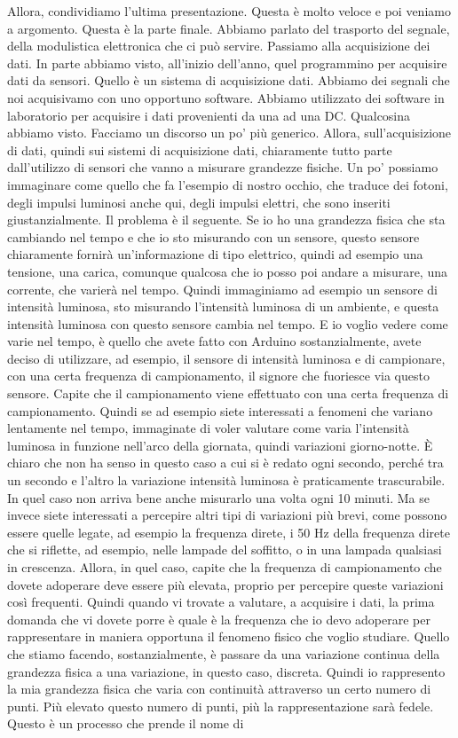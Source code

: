 Allora, condividiamo l'ultima presentazione. Questa è molto veloce e poi veniamo a argomento. Questa è la parte finale. Abbiamo parlato del trasporto del segnale, della modulistica elettronica che ci può servire. Passiamo alla acquisizione dei dati. In parte abbiamo visto, all'inizio dell'anno, quel programmino per acquisire dati da sensori. Quello è un sistema di acquisizione dati. Abbiamo dei segnali che noi acquisivamo con uno opportuno software. Abbiamo utilizzato dei software in laboratorio per acquisire i dati provenienti da una ad una DC. Qualcosina abbiamo visto. Facciamo un discorso un po' più generico. Allora, sull'acquisizione di dati, quindi sui sistemi di acquisizione dati, chiaramente tutto parte dall'utilizzo di sensori che vanno a misurare grandezze fisiche. Un po' possiamo immaginare come quello che fa l'esempio di nostro occhio, che traduce dei fotoni, degli impulsi luminosi anche qui, degli impulsi elettri, che sono inseriti giustanzialmente. Il problema è il seguente. Se io ho una grandezza fisica che sta cambiando nel tempo e che io sto misurando con un sensore, questo sensore chiaramente fornirà un'informazione di tipo elettrico, quindi ad esempio una tensione, una carica, comunque qualcosa che io posso poi andare a misurare, una corrente, che varierà nel tempo. Quindi immaginiamo ad esempio un sensore di intensità luminosa, sto misurando l'intensità luminosa di un ambiente, e questa intensità luminosa con questo sensore cambia nel tempo. E io voglio vedere come varie nel tempo, è quello che avete fatto con Arduino sostanzialmente, avete deciso di utilizzare, ad esempio, il sensore di intensità luminosa e di campionare, con una certa frequenza di campionamento, il signore che fuoriesce via questo sensore. Capite che il campionamento viene effettuato con una certa frequenza di campionamento. Quindi se ad esempio siete interessati a fenomeni che variano lentamente nel tempo, immaginate di voler valutare come varia l'intensità luminosa in funzione nell'arco della giornata, quindi variazioni giorno-notte. È chiaro che non ha senso in questo caso a cui si è redato ogni secondo, perché tra un secondo e l'altro la variazione intensità luminosa è praticamente trascurabile. In quel caso non arriva bene anche misurarlo una volta ogni 10 minuti. Ma se invece siete interessati a percepire altri tipi di variazioni più brevi, come possono essere quelle legate, ad esempio la frequenza direte, i 50 Hz della frequenza direte che si riflette, ad esempio, nelle lampade del soffitto, o in una lampada qualsiasi in crescenza. Allora, in quel caso, capite che la frequenza di campionamento che dovete adoperare deve essere più elevata, proprio per percepire queste variazioni così frequenti. Quindi quando vi trovate a valutare, a acquisire i dati, la prima domanda che vi dovete porre è quale è la frequenza che io devo adoperare per rappresentare in maniera opportuna il fenomeno fisico che voglio studiare. Quello che stiamo facendo, sostanzialmente, è passare da una variazione continua della grandezza fisica a una variazione, in questo caso, discreta. Quindi io rappresento la mia grandezza fisica che varia con continuità attraverso un certo numero di punti. Più elevato questo numero di punti, più la rappresentazione sarà fedele. Questo è un processo che prende il nome di 